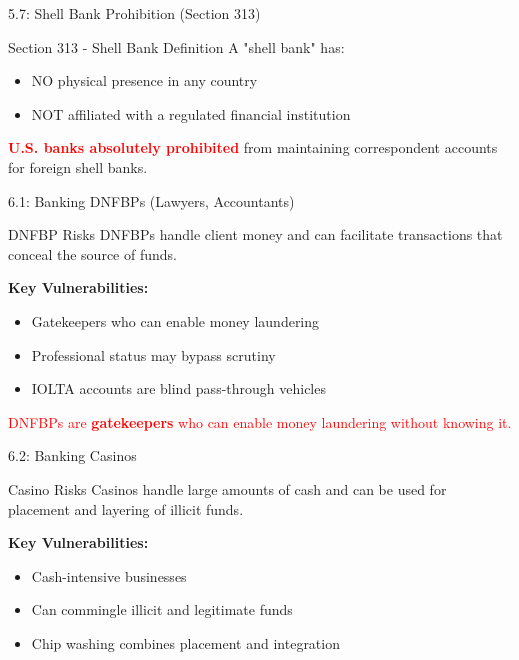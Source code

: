 \documentclass{beamer}
\begin{document}
	\begin{frame}{5.7: Shell Bank Prohibition (Section 313)}
		\begin{block}{Section 313 - Shell Bank Definition}
			A "shell bank" has:
			\begin{itemize}
				\item NO physical presence in any country
				\item NOT affiliated with a regulated financial institution
			\end{itemize}
		\end{block}
		\textcolor{red}{\textbf{U.S. banks absolutely prohibited}} from maintaining correspondent accounts for foreign shell banks.
	\end{frame}
	
	
	\begin{frame}{6.1: Banking DNFBPs (Lawyers, Accountants)}
		\begin{block}{DNFBP Risks}
			DNFBPs handle client money and can facilitate transactions that conceal the source of funds.
		\end{block}
		\textbf{Key Vulnerabilities:}
		\begin{itemize}
			\item Gatekeepers who can enable money laundering
			\item Professional status may bypass scrutiny
			\item IOLTA accounts are blind pass-through vehicles
		\end{itemize}
		\textcolor{red}{DNFBPs are \textbf{gatekeepers} who can enable money laundering without knowing it.}
	\end{frame}
	
	\begin{frame}{6.2: Banking Casinos}
		\begin{block}{Casino Risks}
			Casinos handle large amounts of cash and can be used for placement and layering of illicit funds.
		\end{block}
		\textbf{Key Vulnerabilities:}
		\begin{itemize}
			\item Cash-intensive businesses
			\item Can commingle illicit and legitimate funds
			\item Chip washing combines placement and integration
		\end{itemize}
	\end{frame}
	
\end{document}
